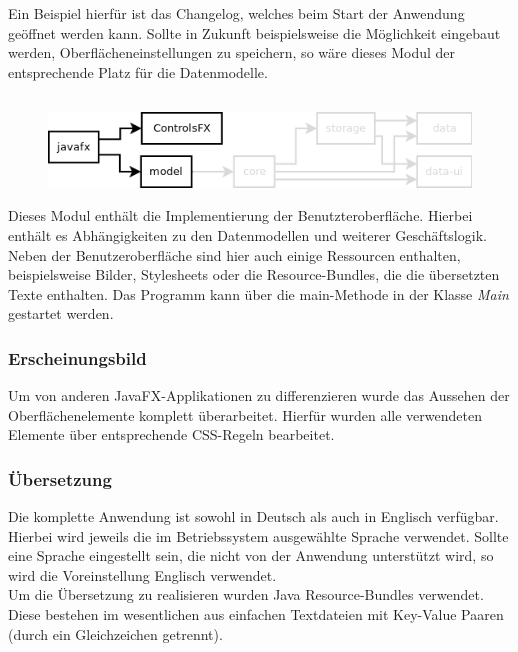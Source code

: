 Ein Beispiel hierfür ist das Changelog, welches beim Start der Anwendung geöffnet werden kann.
Sollte in Zukunft beispielsweise die Möglichkeit eingebaut werden, Oberflächeneinstellungen zu speichern, 
so wäre dieses Modul der entsprechende Platz für die Datenmodelle.

\pagebreak
\subsection{\textModJavaFX}
\label{\textModJavaFX}
\begin{figure}[H]
	\centering
	\includegraphics[width=.8\textwidth]{module_dependencies_javafx.png}
\end{figure}

Dieses Modul enthält die Implementierung der Benutzteroberfläche. Hierbei enthält es Abhängigkeiten
zu den Datenmodellen und weiterer Geschäftslogik. Neben der Benutzeroberfläche sind hier auch einige Ressourcen
enthalten, beispielsweise Bilder, Stylesheets oder die Resource-Bundles, die die übersetzten Texte enthalten.
Das Programm kann über die main-Methode in der Klasse \textit{Main} gestartet werden.

\subsubsection{Erscheinungsbild}
Um \textFlowDesign{} von anderen JavaFX-Applikationen zu differenzieren wurde das Aussehen der Oberflächenelemente
komplett überarbeitet. Hierfür wurden alle verwendeten Elemente über entsprechende CSS-Regeln bearbeitet.

\subsubsection{Übersetzung}
Die komplette Anwendung ist sowohl in Deutsch als auch in Englisch verfügbar. Hierbei wird jeweils die im
Betriebssystem ausgewählte Sprache verwendet. Sollte eine Sprache eingestellt sein, die nicht von der Anwendung
unterstützt wird, so wird die Voreinstellung Englisch verwendet.\\
Um die Übersetzung zu realisieren wurden Java Resource-Bundles verwendet. Diese bestehen im wesentlichen aus
einfachen Textdateien mit Key-Value Paaren (durch ein Gleichzeichen getrennt).

